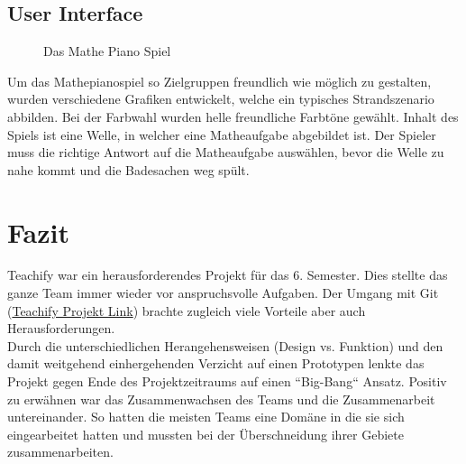 


\subsection{User Interface}
\begin{figure}[H]
	\centering
	\caption{Das Mathe Piano Spiel}
	\label{Das Mathe Piano Spiel}
\end{figure}
Um das Mathepianospiel so Zielgruppen freundlich wie möglich zu gestalten, wurden verschiedene Grafiken entwickelt, welche ein typisches Strandszenario abbilden. Bei der Farbwahl wurden helle freundliche Farbtöne gewählt. Inhalt des Spiels ist eine Welle, in welcher eine Matheaufgabe abgebildet ist. Der Spieler muss die richtige Antwort auf die Matheaufgabe auswählen, bevor die Welle zu nahe kommt und die Badesachen weg spült.



\section{Fazit}
Teachify war ein herausforderendes Projekt für das 6. Semester. Dies stellte das ganze Team immer wieder vor anspruchsvolle Aufgaben. Der Umgang mit Git (\href{https://github.com/cpfeiffer3008/Teachify}{Teachify Projekt Link}) brachte zugleich viele Vorteile aber auch Herausforderungen.\\
Durch die unterschiedlichen Herangehensweisen (Design vs. Funktion) und den damit weitgehend einhergehenden Verzicht auf einen Prototypen lenkte das Projekt gegen Ende des Projektzeitraums auf einen ``Big-Bang`` Ansatz.
Positiv zu erwähnen war das Zusammenwachsen des Teams und die Zusammenarbeit untereinander. So hatten die meisten Teams eine Domäne in die sie sich eingearbeitet hatten und mussten bei der Überschneidung ihrer Gebiete zusammenarbeiten.